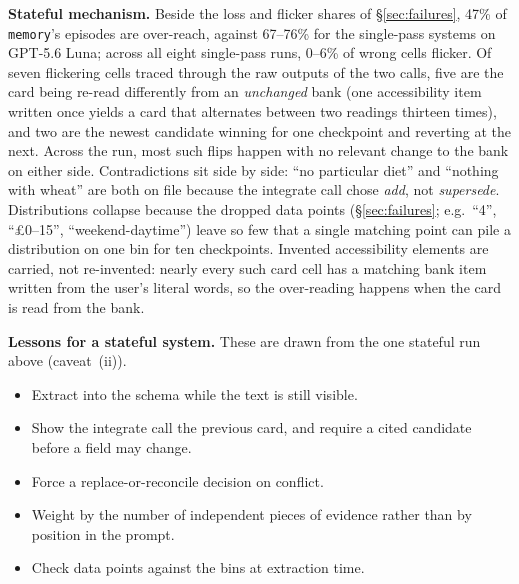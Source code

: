 \documentclass{article}
\begin{document}
\textbf{Stateful mechanism.} Beside the loss and flicker shares of \S\ref{sec:failures},
47\% of \texttt{memory}'s episodes are over-reach, against 67--76\% for the single-pass systems on
GPT-5.6 Luna; across all eight single-pass runs, 0--6\% of wrong cells flicker. Of seven flickering cells
traced through the raw outputs of the two calls, five are the card being re-read differently from an
\emph{unchanged} bank (one accessibility item written once yields a card that alternates between two
readings thirteen times), and two are the newest candidate winning for one checkpoint and reverting
at the next. Across the run, most such flips happen with no relevant change to the bank on either
side. Contradictions sit side by side: ``no particular diet'' and ``nothing with wheat'' are both on
file because the integrate call chose \emph{add}, not \emph{supersede}. Distributions collapse because
the dropped data points (\S\ref{sec:failures}; e.g.\ ``4'', ``\pounds0--15'', ``weekend-daytime'')
leave so few that a single matching point can pile a distribution on one bin for ten checkpoints. Invented accessibility elements are carried, not
re-invented: nearly every such card cell has a matching bank item written from the user's literal
words, so the over-reading happens when the card is read from the bank.

\textbf{Lessons for a stateful system.} These are drawn from the one stateful run above
(caveat~(ii)).
\begin{itemize}[leftmargin=*, itemsep=1pt]
  \item Extract into the schema while the text is still visible.
  \item Show the integrate call the previous card, and require a cited candidate before a field may
  change.
  \item Force a replace-or-reconcile decision on conflict.
  \item Weight by the number of independent pieces of evidence rather than by position in the
  prompt.
  \item Check data points against the bins at extraction time.
\end{itemize}
\end{document}
